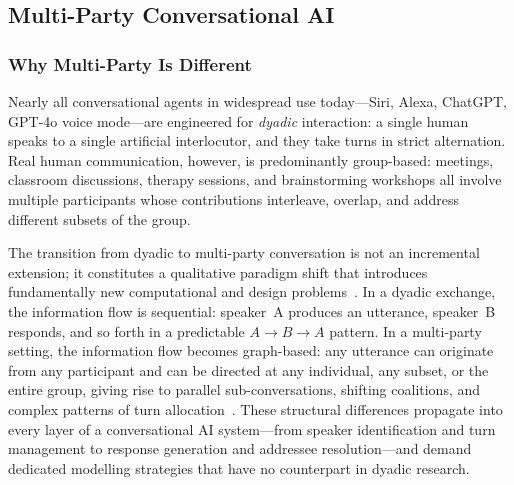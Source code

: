 
\subsection{Multi-Party Conversational AI}
\label{subsec:multiparty-ca}

\subsubsection{Why Multi-Party Is Different}
\label{sssec:multiparty-why}

Nearly all conversational agents in widespread use today---Siri, Alexa,
ChatGPT, GPT-4o voice mode---are engineered for \emph{dyadic} interaction: a
single human speaks to a single artificial interlocutor, and they take turns in
strict alternation.  Real human communication, however, is predominantly
group-based: meetings, classroom discussions, therapy sessions, and
brainstorming workshops all involve multiple participants whose contributions
interleave, overlap, and address different subsets of the group.

The transition from dyadic to multi-party conversation is not an incremental
extension; it constitutes a qualitative paradigm shift that introduces
fundamentally new computational and design
problems~\cite{gu2022mpc,zheng2022polyadic,traum2004issues}.  In a dyadic
exchange, the information flow is sequential: speaker~A produces an utterance,
speaker~B responds, and so forth in a predictable $A \!\to\! B \!\to\! A$
pattern.  In a multi-party setting, the information flow becomes graph-based:
any utterance can originate from any participant and can be directed at any
individual, any subset, or the entire group, giving rise to parallel
sub-conversations, shifting coalitions, and complex patterns of turn
allocation~\cite{gu2022mpc}.  These structural differences propagate into every
layer of a conversational AI system---from speaker identification and turn
management to response generation and addressee resolution---and demand
dedicated modelling strategies that have no counterpart in dyadic research.


